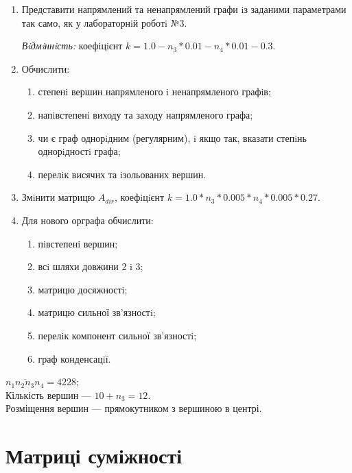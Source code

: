 
\def\basedir{/home/theammir/labs/asd/9/res}


\usepackage{graphicx}
\usepackage[hypcap=false]{caption}



\taskdesc%
\begin{enumerate}
  \item Представити напрямлений та ненапрямлений графи iз заданими параметрами так само, як у лабораторнiй роботi №3.\par
    \emph{Вiдмiннiсть:} коефiцiєнт $k = 1.0 - n_3 * 0.01 - n_4 * 0.01 - 0.3$.
  \item Обчислити:
    \begin{enumerate}
      \item степенi вершин напрямленого i ненапрямленого графiв;
      \item напiвстепенi виходу та заходу напрямленого графа;
      \item чи є граф однорiдним (регулярним), i якщо так, вказати степiнь однорiдностi графа;
      \item перелiк висячих та iзольованих вершин.
    \end{enumerate}
  \item Змiнити матрицю $A_{dir}$, коефiцiєнт $k = 1.0 * n_3 * 0.005 * n_4 * 0.005 * 0.27$.
  \item Для нового орграфа обчислити:
  \begin{enumerate}
    \item пiвстепенi вершин;
    \item всi шляхи довжини 2 i 3;
    \item матрицю досяжностi;
    \item матрицю сильної зв’язностi;
    \item перелiк компонент сильної зв’язностi;
    \item граф конденсацiї.
  \end{enumerate}
\end{enumerate}

\taskspec%
$\overline{n_1 n_2 n_3 n_4} = 4228$;\\
Кількість вершин --- $10 + n_3 = 12$.\\
Розміщення вершин --- прямокутником з вершиною в центрі.


\section{Матриці суміжності}

